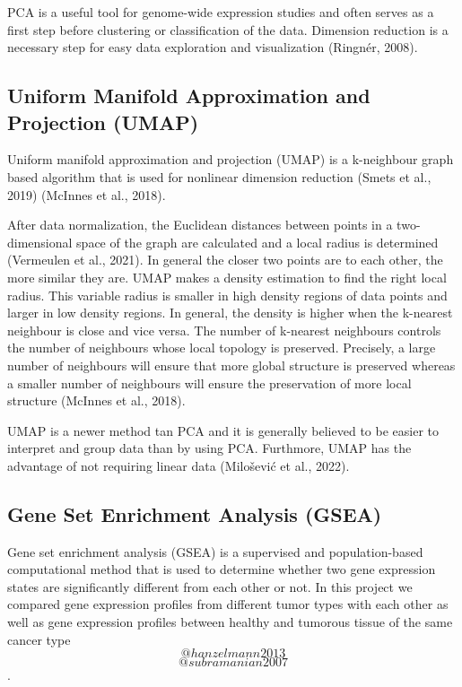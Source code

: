 \documentclass[
]{article}
\begin{document}
PCA is a useful tool for genome-wide expression studies and often serves
as a first step before clustering or classification of the data.
Dimension reduction is a necessary step for easy data exploration and
visualization (Ringnér, 2008).

\hypertarget{uniform-manifold-approximation-and-projection-umap}{%
\subsection{Uniform Manifold Approximation and Projection
(UMAP)}\label{uniform-manifold-approximation-and-projection-umap}}

Uniform manifold approximation and projection (UMAP) is a k-neighbour
graph based algorithm that is used for nonlinear dimension reduction
(Smets et al., 2019) (McInnes et al., 2018).

After data normalization, the Euclidean distances between points in a
two-dimensional space of the graph are calculated and a local radius is
determined (Vermeulen et al., 2021). In general the closer two points
are to each other, the more similar they are. UMAP makes a density
estimation to find the right local radius. This variable radius is
smaller in high density regions of data points and larger in low density
regions. In general, the density is higher when the k-nearest neighbour
is close and vice versa. The number of k-nearest neighbours controls the
number of neighbours whose local topology is preserved. Precisely, a
large number of neighbours will ensure that more global structure is
preserved whereas a smaller number of neighbours will ensure the
preservation of more local structure (McInnes et al., 2018).

UMAP is a newer method tan PCA and it is generally believed to be easier
to interpret and group data than by using PCA. Furthmore, UMAP has the
advantage of not requiring linear data (Milošević et al., 2022).

\hypertarget{gene-set-enrichment-analysis-gsea}{%
\subsection{Gene Set Enrichment Analysis
(GSEA)}\label{gene-set-enrichment-analysis-gsea}}

Gene set enrichment analysis (GSEA) is a supervised and population-based
computational method that is used to determine whether two gene
expression states are significantly different from each other or not. In
this project we compared gene expression profiles from different tumor
types with each other as well as gene expression profiles between
healthy and tumorous tissue of the same cancer type
\[@hanzelmann2013\]\[@subramanian2007\].
\end{document}
